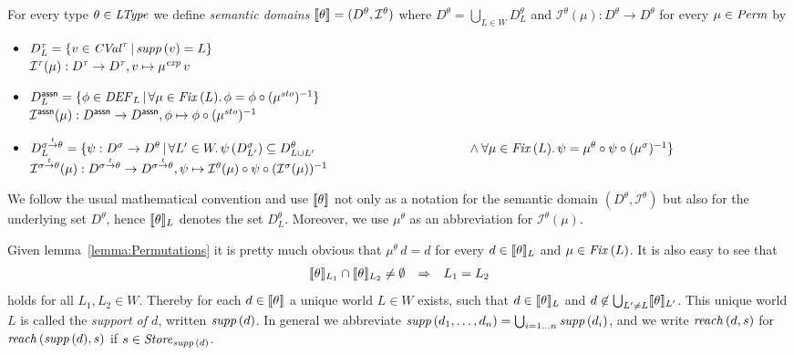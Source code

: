 \documentclass[12pt,a4paper]{report}
\newcommand{\CVal}{\nstyle{CVal}}
\newcommand{\sexp}{\nstyle{exp}}
\newcommand{\ssto}{\nstyle{sto}}
\newcommand{\DEF}{\nstyle{DEF}}
\newcommand{\I}{\mathcal{I}}
\newcommand{\Fix}[1]{\nstyle{Fix}\,(#1)}
\begin{document}
\begin{definition}
  For every type $\theta\in\mathit{LType}$ we define {\em semantic domains} $\semantic{\theta} = (D^\theta,\I^\theta)$ where
  $D^\theta = \bigcup_{L \in W} D^\theta_L$ and $\I^\theta(\mu) : D^\theta \to D^\theta$ for every $\mu \in \mathit{Perm}$ by
  \begin{itemize}
    \item $D^\tau_L = \{v\in\CVal^\tau\,|\,\supp{v} = L\}$ \\
          $\I^\tau(\mu): D^\tau \to D^\tau, v \mapsto \mu^\sexp\,v$

    \item $D^\tassn_L = \{ \phi\in\DEF_L\,|\,\forall \mu\in\Fix{L}.\,\phi = \phi \circ (\mu^\ssto)^{-1}\}$ \\
          $\I^\tassn(\mu): D^\tassn \to D^\tassn, \phi \mapsto \phi \circ (\mu^\ssto)^{-1}$

    \item $D^{\ttarrow{\sigma}{\theta}}_L = \{ \psi: D^\sigma \to D^\theta\,|\,
                          \forall L'\in W.\,\psi\,(D^\sigma_{L'}) \subseteq D^\theta_{L \cup L'} \\
                          \hspace*{4.2cm} \wedge \forall \mu\in\Fix{L}.\,\psi=\mu^\theta\circ\psi\circ(\mu^\sigma)^{-1}\}$\\
          $\I^{\ttarrow{\sigma}{\theta}}(\mu): D^{\ttarrow{\sigma}{\theta}} \to D^{\ttarrow{\sigma}{\theta}},
                                            \psi \mapsto \I^\theta(\mu) \circ \psi \circ (\I^\sigma(\mu))^{-1}$
  \end{itemize}
\end{definition}

We follow the usual mathematical convention and use $\llbracket\theta\rrbracket$ not only as a notation
for the semantic domain $(D^\theta,\I^\theta)$ but also for the underlying set $D^\theta$,
hence $\llbracket\theta\rrbracket_L$ denotes the set $D^\theta_L$. Moreover, we use $\mu^\theta$ as an abbreviation
for $\I^\theta(\mu)$.

Given lemma~\ref{lemma:Permutations}
it is pretty much obvious that $\mu^\theta\,d = d$ for every $d \in \llbracket\theta\rrbracket_L$ and
$\mu\in\Fix{L}$.
It is also easy to see that
\[\begin{array}{rcl}
  \llbracket\theta\rrbracket_{L_1} \cap \llbracket\theta\rrbracket_{L_2} \ne \emptyset &\Rightarrow& L_1=L_2
\end{array}\]
holds for all $L_1,L_2\in W$. Thereby for each $d \in \llbracket\theta\rrbracket$ a
unique world $L \in W$ exists, such that $d \in \llbracket\theta\rrbracket_L$ and $d \not\in \bigcup_{L'\ne L} \llbracket\theta\rrbracket_{L'}$.
This unique world $L$ is called the {\em support of $d$}, written $\mathit{supp}\,(d)$. In general we abbreviate
$\mathit{supp}\,(d_1,\ldots,d_n) = \bigcup_{i=1\ldots n}\mathit{supp}\,(d_i)$, and we write
$\mathit{reach}\,(d,s)$ for $\mathit{reach}\,(\mathit{supp}\,(d),s)$ if $s \in \mathit{Store}_{\mathit{supp}\,(d)}$.
\end{document}
